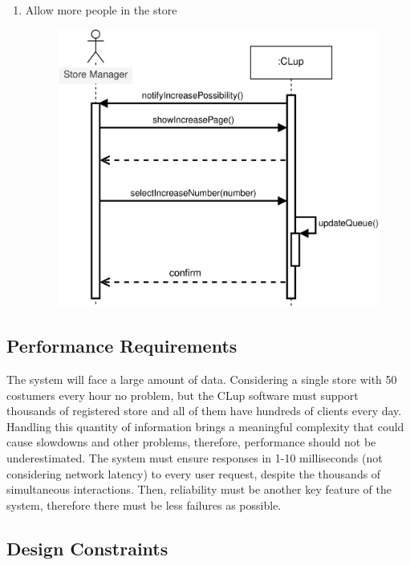 \documentclass[]{article}
\begin{document}
\begin{enumerate}
						\item Allow more people in the store
							\begin{figure}[H]
								\centering
								\includegraphics[]{AllowMorePPlDiagram.png}
								\caption{}
								\label{fig:buildstats_sequencediagram}
							\end{figure}
						
						\newpage
						\end{enumerate}
		
		\subsection{Performance Requirements}
		
		The system will face a large amount of data. Considering a single store with 50 costumers every hour no problem, but the CLup software must support thousands of registered store and all of them have hundreds of clients every day. Handling this quantity of information brings a meaningful complexity that could cause slowdowns and other problems, therefore, performance should not be underestimated. The system must ensure responses in 1-10 milliseconds (not considering network latency) to every user request, despite the thousands of simultaneous interactions. 
		Then, reliability must be another key feature of the system, therefore there must be less failures as possible.
		
		\subsection{Design Constraints}
		
\end{document}
